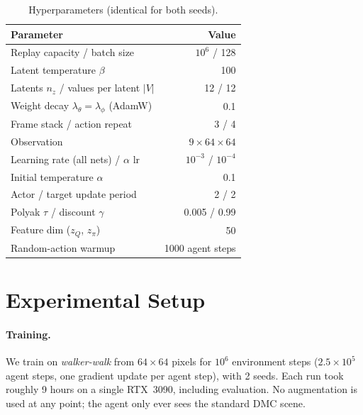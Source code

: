 \documentclass{article}
\theoremstyle{plain}
\theoremstyle{definition}
\theoremstyle{remark}
\begin{document}
\begin{table}[t]
\caption{Hyperparameters (identical for both seeds).}
\label{tab:hparams}
\vskip 0.1in
\begin{center}
\begin{small}
\begin{tabular}{lr}
\toprule
Parameter & Value \\
\midrule
Replay capacity / batch size & $10^6$ / 128 \\
Latent temperature $\beta$ & 100 \\
Latents $n_z$ / values per latent $|V|$ & 12 / 12 \\
Weight decay $\lambda_\theta=\lambda_\phi$ (AdamW) & 0.1 \\
Frame stack / action repeat & 3 / 4 \\
Observation & $9\times64\times64$ \\
Learning rate (all nets) / $\alpha$ lr & $10^{-3}$ / $10^{-4}$ \\
Initial temperature $\alpha$ & 0.1 \\
Actor / target update period & 2 / 2 \\
Polyak $\tau$ / discount $\gamma$ & 0.005 / 0.99 \\
Feature dim ($z_Q$, $z_\pi$) & 50 \\
Random-action warmup & 1000 agent steps \\
\bottomrule
\end{tabular}
\end{small}
\end{center}
\vskip -0.1in
\end{table}

\section{Experimental Setup}
\label{sec:setup}

\paragraph{Training.} We train on \emph{walker-walk} from $64{\times}64$ pixels
for $10^6$ environment steps ($2.5{\times}10^5$ agent steps, one gradient update
per agent step), with 2 seeds. Each run took roughly 9 hours on a single
RTX~3090, including evaluation. No augmentation is used at any point; the agent
only ever sees the standard DMC scene.
\end{document}
